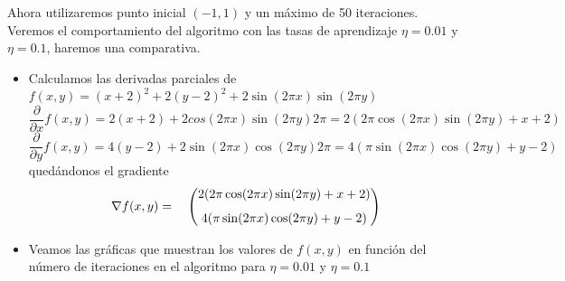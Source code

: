\documentclass[11pt,a4paper]{article}
\theoremstyle{definition}
\begin{document}
	Ahora utilizaremos punto inicial $(-1,1)$ y un máximo de 50 iteraciones. Veremos el comportamiento del algoritmo con las tasas de aprendizaje $\eta =0.01$ y $\eta = 0.1$, haremos una comparativa.
	\begin{itemize}
	\item Calculamos las derivadas parciales de $f(x,y)=(x+2)^2+2(y-2)^2+2\sin(2\pi x)\sin(2\pi y)$
	$$\frac{\partial}{\partial x} f(x,y)=2(x+2)+2cos(2\pi x)\sin(2\pi y)2\pi= 2(2\pi \cos(2\pi x)\sin(2\pi y)+x+2)$$
	$$\frac{\partial}{\partial y} f(x,y)=4(y-2)+2\sin(2\pi x)\cos(2\pi y)2\pi =4(\pi\sin(2\pi x)\cos(2\pi y)+y-2)$$
	quedándonos el gradiente
	$$\nabla f(x,y)=\begin{matrix}
	& \left(\begin{matrix}
	2(2\pi \cos(2\pi x)\sin(2\pi y)+x+2)  \vspace{2.5mm}\\
	4(\pi\sin(2\pi x)\cos(2\pi y)+y-2)\\
	\end{matrix}\right)
	\end{matrix}
	$$
	\item Veamos las gráficas que muestran los valores de $f(x,y)$ en función del número de iteraciones en el algoritmo para $\eta = 0.01$ y $\eta =0.1$
	

\end{itemize}
\end{document}
